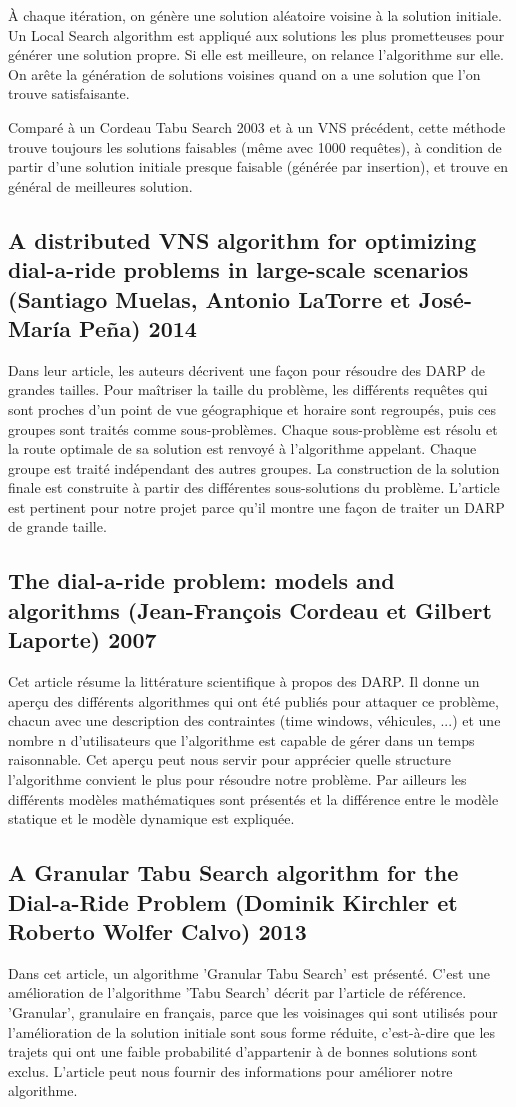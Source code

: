 \documentclass[10pt,a4paper]{report}
\begin{document}
À chaque itération, on génère une  solution aléatoire voisine à la solution initiale. Un Local Search algorithm est appliqué aux solutions les plus prometteuses pour générer une solution propre. Si elle est meilleure, on relance l'algorithme sur elle.
On arête la génération de solutions voisines quand on a une solution que l'on trouve satisfaisante.

Comparé à un Cordeau Tabu Search 2003 et à un VNS précédent, cette méthode trouve toujours les solutions faisables (même avec 1000 requêtes), à condition de partir d'une solution initiale presque faisable (générée par insertion), et trouve en général de meilleures solution.
\subsection*{A distributed VNS algorithm for optimizing dial-a-ride problems in large-scale scenarios (Santiago Muelas, Antonio LaTorre et José-María Peña) 2014}
Dans leur article, les auteurs décrivent une façon pour résoudre des DARP de grandes tailles. Pour maîtriser la taille du problème, les différents requêtes qui sont proches d'un point de vue géographique et horaire sont regroupés, puis ces groupes sont traités comme sous-problèmes. Chaque sous-problème est résolu et la route optimale de sa solution est renvoyé à l'algorithme appelant. Chaque groupe est traité indépendant des autres groupes. La construction de la solution finale est construite à partir des différentes sous-solutions du problème. L'article est pertinent pour notre projet parce qu'il montre une façon de traiter un DARP de grande taille.
\subsection*{The dial-a-ride problem: models and algorithms (Jean-François Cordeau et Gilbert Laporte) 2007}
Cet article résume la littérature scientifique à propos des DARP. Il donne un aperçu des différents algorithmes qui ont été publiés pour attaquer ce problème, chacun avec une description des contraintes (time windows, véhicules, ...) et une nombre n d'utilisateurs que l'algorithme est capable de gérer dans un temps raisonnable. Cet aperçu peut nous servir pour apprécier quelle structure l'algorithme convient le plus pour résoudre notre problème. Par ailleurs les différents modèles mathématiques sont présentés et la différence entre le modèle statique et le modèle dynamique est expliquée.
\subsection*{A Granular Tabu Search algorithm for the Dial-a-Ride Problem (Dominik Kirchler et Roberto Wolfer Calvo) 2013}
Dans cet article, un algorithme 'Granular Tabu Search' est présenté. C'est une amélioration de l'algorithme 'Tabu Search' décrit par l'article de référence. 'Granular', granulaire en français, parce que les voisinages qui sont utilisés pour l'amélioration de la solution initiale sont sous forme réduite, c'est-à-dire que les trajets qui ont une faible probabilité d'appartenir à de bonnes solutions sont exclus. L'article peut nous fournir des informations pour améliorer notre algorithme.
\end{document}
